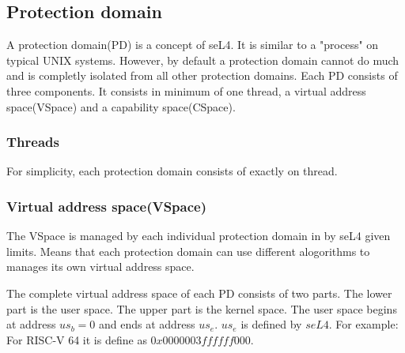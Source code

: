 \subsection{Protection domain}
A protection domain(PD) is a concept of seL4. It is similar to a "process" on typical UNIX systems. 
However, by default a protection domain cannot do much and is completly isolated from all other protection domains.
Each PD consists of three components. It consists in minimum of one thread, a virtual address space(VSpace) and a capability space(CSpace).

\subsubsection{Threads}
For simplicity, each protection domain consists of exactly on thread.

\subsubsection{Virtual address space(VSpace)}
The VSpace is managed by each individual protection domain in by seL4 given limits. Means that each protection domain can use different alogorithms to manages its
own virtual address space.

The complete virtual address space of each PD consists of two parts.
The lower part is the user space. The upper part is the kernel space.
The user space begins at address $us_b = 0$ and ends at address $us_e$. $us_e$ is defined
by $seL4$. For example: For RISC-V 64 it is define as $0x0000003ffffff000$.



